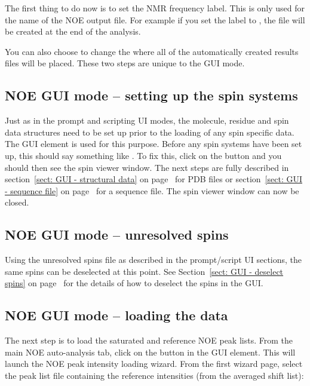 The first thing to do now is to set the NMR frequency label.  This is only used for the name of the NOE output file.  For example if you set the label to , the file  will be created at the end of the analysis.

You can also choose to change the  where all of the automatically created results files will be placed.  These two steps are unique to the GUI mode.



\subsection{NOE GUI mode -- setting up the spin systems}

Just as in the prompt and scripting UI modes, the molecule, residue and spin data structures need to be set up prior to the loading of any spin specific data.  The  GUI element is used for this purpose.  Before any spin systems have been set up, this should say something like .  To fix this, click on the  button and you should then see the spin viewer window.  The next steps are fully described in section~\ref{sect: GUI - structural data} on page~\pageref{sect: GUI - structural data} for PDB files or section~\ref{sect: GUI - sequence file} on page~\pageref{sect: GUI - sequence file} for a sequence file.  The spin viewer window can now be closed.



\subsection{NOE GUI mode -- unresolved spins}

Using the unresolved spins file as described in the prompt/script UI sections, the same spins can be deselected at this point.  See Section~\ref{sect: GUI - deselect spins} on page~\pageref{sect: GUI - deselect spins} for the details of how to deselect the spins in the GUI.



\subsection{NOE GUI mode -- loading the data}

The next step is to load the saturated and reference NOE peak lists.  From the main NOE auto-analysis tab, click on the  button in the  GUI element.  This will launch the NOE peak intensity loading wizard.  From the first wizard page, select the peak list file containing the reference intensities (from the averaged shift list):

